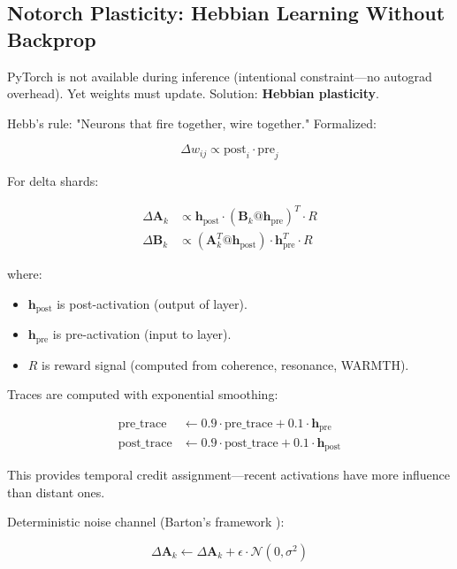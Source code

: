 \documentclass[11pt,a4paper]{article}
\begin{document}
\subsection{Notorch Plasticity: Hebbian Learning Without Backprop}

PyTorch is not available during inference (intentional constraint—no autograd overhead). Yet weights must update. Solution: \textbf{Hebbian plasticity}.

Hebb's rule: "Neurons that fire together, wire together." Formalized:

\begin{equation}
\Delta w_{ij} \propto \text{post}_i \cdot \text{pre}_j
\end{equation}

For delta shards:

\begin{align}
\Delta \mathbf{A}_k &\propto \mathbf{h}_{\text{post}} \cdot (\mathbf{B}_k @ \mathbf{h}_{\text{pre}})^T \cdot R \label{eq:hebb1} \\
\Delta \mathbf{B}_k &\propto (\mathbf{A}_k^T @ \mathbf{h}_{\text{post}}) \cdot \mathbf{h}_{\text{pre}}^T \cdot R \label{eq:hebb2}
\end{align}

where:

\begin{itemize}
\item $\mathbf{h}_{\text{post}}$ is post-activation (output of layer).
\item $\mathbf{h}_{\text{pre}}$ is pre-activation (input to layer).
\item $R$ is reward signal (computed from coherence, resonance, WARMTH).
\end{itemize}

Traces are computed with exponential smoothing:

\begin{align}
\text{pre\_trace} &\gets 0.9 \cdot \text{pre\_trace} + 0.1 \cdot \mathbf{h}_{\text{pre}} \\
\text{post\_trace} &\gets 0.9 \cdot \text{post\_trace} + 0.1 \cdot \mathbf{h}_{\text{post}}
\end{align}

This provides temporal credit assignment—recent activations have more influence than distant ones.

Deterministic noise channel (Barton's framework \cite{barton2024}):

\begin{equation}
\Delta \mathbf{A}_k \gets \Delta \mathbf{A}_k + \epsilon \cdot \mathcal{N}(0, \sigma^2)
\end{equation}
\end{document}

